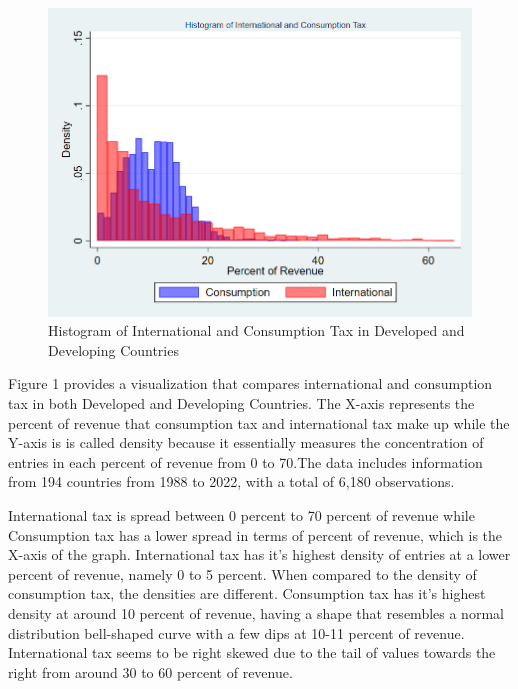 \documentclass[12pt]{article}
\begin{document}
\begin{figure}[H]
    \centering
    \includegraphics[width=0.8\linewidth]{Reproducibility_Package//research_outputs/twowayhistintcons.png}
    \caption{Histogram of International and Consumption Tax in Developed and Developing Countries}
    \label{fig:enter-label}
\end{figure}

Figure 1 provides a visualization that compares international and consumption tax in both Developed and Developing Countries. The X-axis represents the percent of revenue that consumption tax and international tax make up while the Y-axis is is called density because it essentially measures the concentration of entries in each percent of revenue from 0 to 70.The data includes information from 194 countries from 1988 to 2022, with a total of 6,180 observations. 

International tax is spread between 0 percent to 70 percent of revenue while Consumption tax has a lower spread in terms of percent of revenue, which is the X-axis of the graph. International tax has it’s highest density of entries at a lower percent of revenue, namely 0 to 5 percent. When compared to the density of consumption tax, the densities are different. Consumption tax has it’s highest density at around 10 percent of revenue, having a shape that resembles a normal distribution bell-shaped curve with a few dips at 10-11 percent of revenue. International tax seems to be right skewed due to the tail of values towards the right from around 30 to 60 percent of revenue. 
\end{document}
